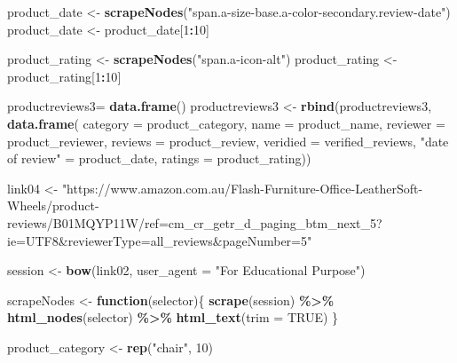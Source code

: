 \documentclass[
]{article}
\newenvironment{Shaded}{\begin{snugshade}}{\end{snugshade}}
\newcommand{\AttributeTok}[1]{\textcolor[rgb]{0.13,0.29,0.53}{#1}}
\newcommand{\ConstantTok}[1]{\textcolor[rgb]{0.56,0.35,0.01}{#1}}
\newcommand{\ControlFlowTok}[1]{\textcolor[rgb]{0.13,0.29,0.53}{\textbf{#1}}}
\newcommand{\DecValTok}[1]{\textcolor[rgb]{0.00,0.00,0.81}{#1}}
\newcommand{\FunctionTok}[1]{\textcolor[rgb]{0.13,0.29,0.53}{\textbf{#1}}}
\newcommand{\NormalTok}[1]{#1}
\newcommand{\OtherTok}[1]{\textcolor[rgb]{0.56,0.35,0.01}{#1}}
\newcommand{\SpecialCharTok}[1]{\textcolor[rgb]{0.81,0.36,0.00}{\textbf{#1}}}
\newcommand{\StringTok}[1]{\textcolor[rgb]{0.31,0.60,0.02}{#1}}
\begin{document}
\begin{Shaded}
\begin{Highlighting}[]
\NormalTok{  product\_date }\OtherTok{\textless{}{-}} \FunctionTok{scrapeNodes}\NormalTok{(}\StringTok{"span.a{-}size{-}base.a{-}color{-}secondary.review{-}date"}\NormalTok{)}
\NormalTok{  product\_date }\OtherTok{\textless{}{-}}\NormalTok{ product\_date[}\DecValTok{1}\SpecialCharTok{:}\DecValTok{10}\NormalTok{]}
  
\NormalTok{  product\_rating }\OtherTok{\textless{}{-}} \FunctionTok{scrapeNodes}\NormalTok{(}\StringTok{"span.a{-}icon{-}alt"}\NormalTok{)}
\NormalTok{  product\_rating }\OtherTok{\textless{}{-}}\NormalTok{ product\_rating[}\DecValTok{1}\SpecialCharTok{:}\DecValTok{10}\NormalTok{]}
  
\NormalTok{  productreviews3}\OtherTok{=} \FunctionTok{data.frame}\NormalTok{()}
\NormalTok{  productreviews3 }\OtherTok{\textless{}{-}} \FunctionTok{rbind}\NormalTok{(productreviews3, }\FunctionTok{data.frame}\NormalTok{(}
                      \AttributeTok{category =}\NormalTok{ product\_category,}
                      \AttributeTok{name =}\NormalTok{ product\_name,}
                      \AttributeTok{reviewer =}\NormalTok{ product\_reviewer,}
                      \AttributeTok{reviews =}\NormalTok{ product\_review,}
                      \AttributeTok{veridied =}\NormalTok{ verified\_reviews,}
                      \StringTok{"date of review"} \OtherTok{=}\NormalTok{ product\_date,}
                      \AttributeTok{ratings =}\NormalTok{ product\_rating))}
  
\NormalTok{link04 }\OtherTok{\textless{}{-}} \StringTok{"https://www.amazon.com.au/Flash{-}Furniture{-}Office{-}LeatherSoft{-}Wheels/product{-}reviews/B01MQYP11W/ref=cm\_cr\_getr\_d\_paging\_btm\_next\_5?ie=UTF8\&reviewerType=all\_reviews\&pageNumber=5"}


\NormalTok{  session }\OtherTok{\textless{}{-}} \FunctionTok{bow}\NormalTok{(link02,}
               \AttributeTok{user\_agent =} \StringTok{"For Educational Purpose"}\NormalTok{)}

\NormalTok{  scrapeNodes }\OtherTok{\textless{}{-}} \ControlFlowTok{function}\NormalTok{(selector)\{}
    \FunctionTok{scrape}\NormalTok{(session) }\SpecialCharTok{\%\textgreater{}\%}
      \FunctionTok{html\_nodes}\NormalTok{(selector) }\SpecialCharTok{\%\textgreater{}\%}
      \FunctionTok{html\_text}\NormalTok{(}\AttributeTok{trim =} \ConstantTok{TRUE}\NormalTok{)}
\NormalTok{  \}}

\NormalTok{  product\_category }\OtherTok{\textless{}{-}} \FunctionTok{rep}\NormalTok{(}\StringTok{"chair"}\NormalTok{, }\DecValTok{10}\NormalTok{)}


\end{Highlighting}
\end{Shaded}
\end{document}
